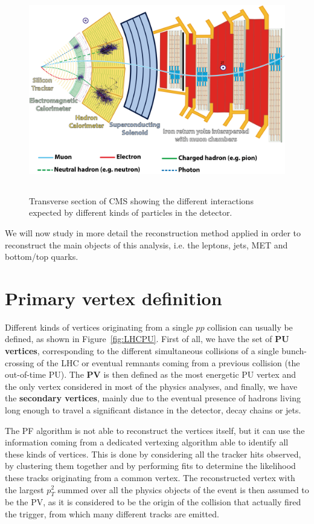 \documentclass[a4paper, 10pt, openright]{report}
\begin{document}
\begin{figure}[htbp]
\begin{center}
\includegraphics[width=14.5cm, height=9cm]{figs/CMSIdentify.png}
\caption{Transverse section of \ac{CMS} showing the different interactions expected by different kinds of particles in the detector.}
\label{fig:CMSIdentify}
\end{center}
\end{figure}

We will now study in more detail the reconstruction method applied in order to reconstruct the main objects of this analysis, i.e. the leptons, jets, \ac{MET} and bottom/top quarks.

\section{Primary vertex definition} \label{section:PVDef}

Different kinds of vertices originating from a single $pp$ collision can usually be defined, as shown in Figure~\ref{fig:LHCPU}. First of all, we have the set of \textbf{\ac{PU} vertices}, corresponding to the different simultaneous collisions of a single bunch-crossing of the \ac{LHC} or eventual remnants coming from a previous collision (the out-of-time \ac{PU}). The \textbf{\ac{PV}} is then defined as the most energetic \ac{PU} vertex and the only vertex considered in most of the physics analyses, and finally, we have the \textbf{secondary vertices}, mainly due to the eventual presence of hadrons living long enough to travel a significant distance in the detector, decay chains or jets. 

The \ac{PF} algorithm is not able to reconstruct the vertices itself, but it can use the information coming from a dedicated vertexing algorithm able to identify all these kinds of vertices. This is done by considering all the tracker hits observed, by clustering them together and by performing fits to determine the likelihood these tracks originating from a common vertex. The reconstructed vertex with the largest $p_T^2$ summed over all the physics objects of the event is then assumed to be the \ac{PV}, as it is considered to be the origin of the collision that actually fired the trigger, from which many different tracks are emitted.
\end{document}
